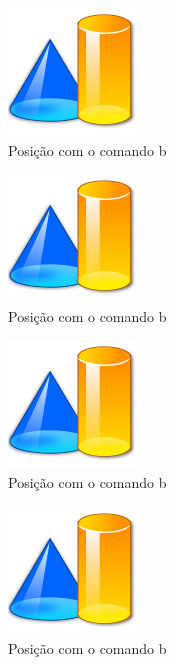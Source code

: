 \documentclass{book}
\newcommand\blankpage{%
    \null
    \thispagestyle{empty}%
    \addtocounter{page}{-1}%
    \newpage}
\begin{document}
	\begin{figure}[H]
	  \centering
	  \includegraphics[scale=2]{formas.png}
	  \caption{Posição com o comando b}
	 \end{figure}
	 \lipsum[3-11]
	 \afterpage{\newpage}

	\blankpage
	
	\lipsum[1]
	\begin{figure}[h]
	  \centering
	  \includegraphics[scale=2]{formas.png}
	  \caption{Posição com o comando b}
	\end{figure}
	\lipsum[2]

	\begin{figure}[h]
	  \centering
	  \includegraphics[scale=2]{formas.png}
	  \caption{Posição com o comando b}
	 \end{figure}
	 \lipsum[3-11]
	 \blankpage
	
	\lipsum[1]
	\begin{figure}[p]
	  \centering
	  \includegraphics[scale=2]{formas.png}
	  \caption{Posição com o comando b}
	\end{figure}
	\lipsum[2]
\end{document}
